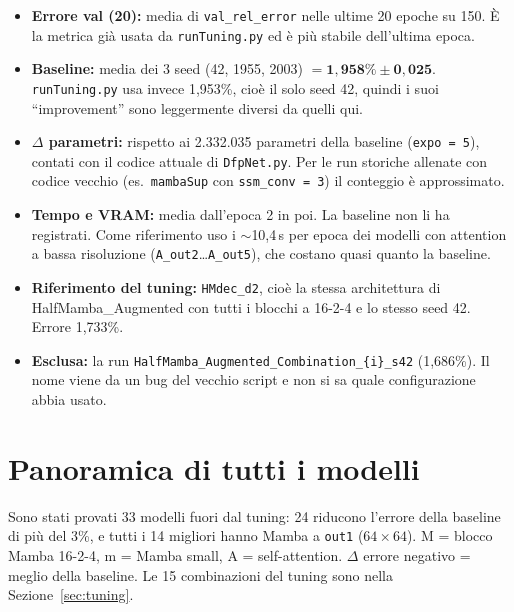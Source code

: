 \documentclass[11pt,a4paper]{article}
\newcommand{\cfg}[1]{\texttt{#1}}
\begin{document}
\begin{itemize}
  \item \textbf{Errore val (20):} media di \cfg{val\_rel\_error} nelle ultime 20 epoche su 150. È la metrica già usata da \cfg{runTuning.py} ed è più stabile dell'ultima epoca.
  \item \textbf{Baseline:} media dei 3 seed (42, 1955, 2003) $= \mathbf{1{,}958\% \pm 0{,}025}$. \cfg{runTuning.py} usa invece 1,953\%, cioè il solo seed 42, quindi i suoi ``improvement'' sono leggermente diversi da quelli qui.
  \item \textbf{$\Delta$ parametri:} rispetto ai 2.332.035 parametri della baseline (\cfg{expo = 5}), contati con il codice attuale di \cfg{DfpNet.py}. Per le run storiche allenate con codice vecchio (es.\ \cfg{mambaSup} con \cfg{ssm\_conv = 3}) il conteggio è approssimato.
  \item \textbf{Tempo e VRAM:} media dall'epoca 2 in poi. La baseline non li ha registrati. Come riferimento uso i $\sim$10,4\,s per epoca dei modelli con attention a bassa risoluzione (\cfg{A\_out2}\dots\cfg{A\_out5}), che costano quasi quanto la baseline.
  \item \textbf{Riferimento del tuning:} \cfg{HMdec\_d2}, cioè la stessa architettura di HalfMamba\_Augmented con tutti i blocchi a 16-2-4 e lo stesso seed 42. Errore 1,733\%.
  \item \textbf{Esclusa:} la run \cfg{HalfMamba\_Augmented\_Combination\_\{i\}\_s42} (1,686\%). Il nome viene da un bug del vecchio script e non si sa quale configurazione abbia usato.
\end{itemize}

\section{Panoramica di tutti i modelli}

Sono stati provati 33 modelli fuori dal tuning: 24 riducono l'errore della baseline di più del 3\%, e tutti i 14 migliori hanno Mamba a \cfg{out1} ($64\times64$). M = blocco Mamba 16-2-4, m = Mamba small, A = self-attention. $\Delta$ errore negativo = meglio della baseline. Le 15 combinazioni del tuning sono nella Sezione~\ref{sec:tuning}.
\end{document}

